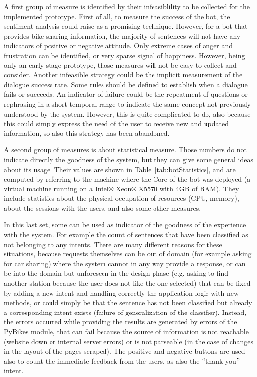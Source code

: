 A first group of measure is identified by their infeasiblility to be collected for the implemented prototype. First of all, to measure the success of the bot, the sentiment analysis could raise as a promising technique. However, for a bot that provides bike sharing information, the majority of sentences will not have any indicators of positive or negative attitude. Only extreme cases of anger and frustration can be identified, or very sparse signal of happiness. However, being only an early stage prototype, those measures will not be easy to collect and consider. Another infeasible strategy could be the implicit measurement of the dialogue success rate. Some rules should be defined to establish when a dialogue fails or succeeds. An indicator of failure could be the repeatment of questions or rephrasing in a short temporal range to indicate the same concept not previously understood by the system. However, this is quite complicated to do, also because this could simply express the need of the user to receive new and updated information, so also this strategy has been abandoned.




A second group of measures is about statistical measure. Those numbers do not indicate directly the goodness of the system, but they can give some general ideas about its usage. Their values are shown in Table~\ref{tab:botStatistics}, and are computed by referring to the machine where the Core of the bot was deployed (a virtual machine running on a Intel® Xeon® X5570 with 4GB of RAM). They include statistics about the physical occupation of resources (CPU, memory), about the sessions with the users, and also some other measures.

In this last set, some can be used as indicator of the goodness of the experience with the system. For example the count of sentences that have been classified as not belonging to any intents. There are many different reasons for these situations, because requests themselves can be out of domain (for example asking for car sharing) where the system cannot in any way provide a response, or can be into the domain but unforeseen in the design phase (e.g. asking to find another station because the user does not like the one selected) that can be fixed by adding a new intent and handling correctly the application logic with new methods, or could simply be that the sentence has not been classified but already a corresponding intent exists (failure of generalization of the classifier). Instead, the errors occurred while providing the results are generated by errors of the PyBikes module, that can fail because the source of information is not reachable (website down or internal server errors) or is not parseable (in the case of changes in the layout of the pages scraped). The positive and negative buttons are used also to count the immediate feedback from the users, as also the $``$thank you$"$  intent.

